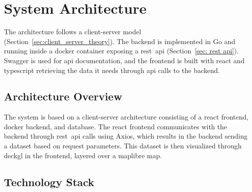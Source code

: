 
\section{System Architecture}
\label{sec:system_architecture}

The architecture follows a client-server model (Section~\ref{sec:client_server_theory}). The backend is implemented in Go and running inside a \gls{docker} container exposing a \acrshort{rest}~\acrshort{api} (Section~\ref{sec: rest api}). Swagger is used for \acrshort{api} documentation, and the frontend is built with \gls{react} and \gls{typescript} retrieving the data it needs through \acrshort{api} calls to the backend.


\subsection{Architecture Overview}

The system is based on a client-server architecture consisting of a \gls{react} frontend, \gls{docker} backend, and database. The \gls{react} frontend communicates with the backend through \acrshort{rest}~\acrshort{api} calls using Axios, which results in the backend sending a dataset based on request parameters. This dataset is then visualized through \gls{deckgl} in the frontend, layered over a \gls{maplibre} map.

\subsection{Technology Stack}

